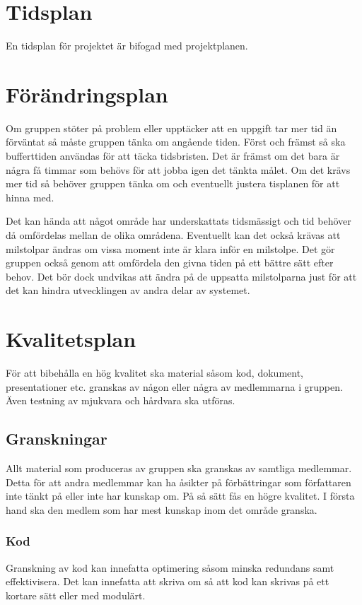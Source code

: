 \documentclass[projektplan/plan.tex]{subfiles}
\begin{document}
\section{Tidsplan}
En tidsplan för projektet är bifogad med projektplanen.

\section{Förändringsplan}
Om gruppen stöter på problem eller upptäcker att en uppgift tar mer tid än
förväntat så måste gruppen tänka om angående tiden. Först och främst så ska
bufferttiden användas för att täcka tidsbristen. Det är främst om det bara är
några få timmar som behövs för att jobba igen det tänkta målet. Om det krävs
mer tid så behöver gruppen tänka om och eventuellt justera tisplanen för att
hinna med. 

Det kan hända att något område har underskattats tidsmässigt och tid behöver då
omfördelas mellan de olika områdena. Eventuellt kan det också krävas att
milstolpar ändras om vissa moment inte är klara inför en milstolpe.  Det gör
gruppen också genom att omfördela den givna tiden på ett bättre sätt efter
behov. Det bör dock undvikas att ändra på de uppsatta milstolparna just för att
det kan hindra utvecklingen av andra delar av systemet.

\section{Kvalitetsplan}
För att bibehålla en hög kvalitet ska material såsom kod, dokument,
presentationer etc. granskas av någon eller några av medlemmarna i gruppen.
Även testning av mjukvara och hårdvara ska utföras.

\subsection{Granskningar}
Allt material som produceras av gruppen ska granskas av samtliga medlemmar.
Detta för att andra medlemmar kan ha åsikter på förbättringar som författaren
inte tänkt på eller inte har kunskap om. På så sätt fås en högre kvalitet. I
första hand ska den medlem som har mest kunskap inom det område granska.

\subsubsection{Kod}	
Granskning av kod kan innefatta optimering såsom minska redundans samt
effektivisera. Det kan innefatta att skriva om så att kod kan skrivas på ett
kortare sätt eller med modulärt.
\end{document}
